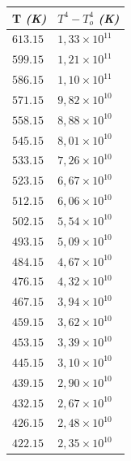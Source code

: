 \documentclass[letterpaper, 12pt]{article}
\begin{document}
\begin{table}[H]
      \begin{tabularx}{\linewidth}{|>{\centering\arraybackslash}X|>{\centering\arraybackslash}X|}
            \hline
            T \textit{(K)} & $T^{4} - T_{o}^{4}$ \textit{(K)} \\\hline
            $613.15$       & $1,33 \times 10^{11}$            \\\hline
            $599.15$       & $1,21 \times 10^{11}$            \\\hline
            $586.15$       & $1,10 \times 10^{11}$            \\\hline
            $571.15$       & $9,82 \times 10^{10}$            \\\hline
            $558.15$       & $8,88 \times 10^{10}$            \\\hline
            $545.15$       & $8,01 \times 10^{10}$            \\\hline
            $533.15$       & $7,26 \times 10^{10}$            \\\hline
            $523.15$       & $6,67 \times 10^{10}$            \\\hline
            $512.15$       & $6,06 \times 10^{10}$            \\\hline
            $502.15$       & $5,54 \times 10^{10}$            \\\hline
            $493.15$       & $5,09 \times 10^{10}$            \\\hline
            $484.15$       & $4,67 \times 10^{10}$            \\\hline
            $476.15$       & $4,32 \times 10^{10}$            \\\hline
            $467.15$       & $3,94 \times 10^{10}$            \\\hline
            $459.15$       & $3,62 \times 10^{10}$            \\\hline
            $453.15$       & $3,39 \times 10^{10}$            \\\hline
            $445.15$       & $3,10 \times 10^{10}$            \\\hline
            $439.15$       & $2,90 \times 10^{10}$            \\\hline
            $432.15$       & $2,67 \times 10^{10}$            \\\hline
            $426.15$       & $2,48 \times 10^{10}$            \\\hline
            $422.15$       & $2,35 \times 10^{10}$            \\\hline

\end{tabularx}
\end{table}
\end{document}

